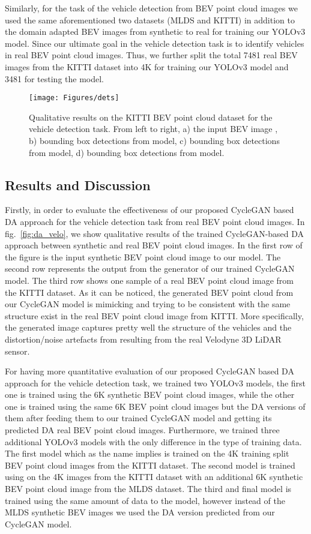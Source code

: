 \documentclass[letterpaper, 10 pt, conference]{IEEEtran}
\begin{document}
\smallbreak
Similarly, for the task of the vehicle detection from BEV point cloud images we used the same aforementioned two datasets (MLDS and KITTI) in addition to the domain adapted BEV images from synthetic to real for training our YOLOv3 model. Since our ultimate goal in the vehicle detection task is to identify vehicles in real BEV point cloud images. Thus, we further split the total 7481 real BEV images from the KITTI dataset into 4K for training our YOLOv3 model and 3481 for testing the model. 

	\begin{figure*}[t]
		\centering
		\texttt{[image: Figures/dets]}
		\caption{Qualitative results on the KITTI BEV point cloud dataset for the vehicle detection task. From left to right, a) the input BEV image , b) bounding box detections from  model, c) bounding box detections from  model, d) bounding box detections from  model.}
		\label{fig:frmwrk}
	\end{figure*}
\subsection{Results and Discussion}
Firstly, in order to evaluate the effectiveness of our proposed CycleGAN based DA approach for the vehicle detection task from real BEV point cloud images. In fig.~\ref{fig:da_velo}, we show qualitative results of the trained CycleGAN-based DA approach between synthetic and real BEV point cloud images. In the first row of the figure is the input synthetic BEV point cloud image to our model. The second row represents the output from the generator  of our trained CycleGAN model. The third row shows one sample of a real BEV point cloud image from the KITTI dataset. As it can be noticed, the generated BEV point cloud from our CycleGAN model is mimicking and trying to be consistent with the same structure exist in the real BEV point cloud image from KITTI. More specifically, the generated image captures pretty well the structure of the vehicles and the distortion/noise artefacts from resulting from the real Velodyne 3D LiDAR sensor. 

\smallbreak
For having more quantitative evaluation of our proposed CycleGAN based DA approach for the vehicle detection task, we trained two YOLOv3 models, the first one  is trained using the 6K synthetic BEV point cloud images, while the other one  is trained using the same 6K BEV point cloud images but the DA versions of them after feeding them to our trained CycleGAN model and getting its predicted DA real BEV point cloud images. Furthermore, we trained three additional YOLOv3 models with the only difference in the type of training data. The first model  which as the name implies is trained on the 4K training split BEV point cloud images from the KITTI dataset. The second model  is trained using on the 4K images from the KITTI dataset with an additional 6K synthetic BEV point cloud image from the MLDS dataset. The third and final model  is trained using the same amount of data to the  model, however instead of the MLDS synthetic BEV images we used the DA version predicted from our CycleGAN model. 
\end{document}
